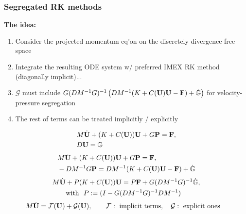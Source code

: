 \begin{frame}
\frametitle{Segregated RK methods}
\textbf{The idea:}
\begin{enumerate}
\item Consider the projected momentum eq'on on the discretely divergence free space
\item<4-> Integrate the resulting ODE system w/ preferred IMEX RK method (diagonally implicit)...
\item<5-> $\mathcal{G}$ must include $G(DM^{-1}G)^{-1} \left( DM^{-1}(K+C({\bf U}){\bf U} - {\bf F})+ \dot{\mathbb{G}} \right)$ for velocity-pressure segregation
\item<6-> The rest of terms can be treated implicitly / explicitly
\end{enumerate}
\begin{overprint}
\begin{align*}
&M\dot{{\bf U}}+(K+C({\bf U})){\bf U}+ G{\bf P}={\bf F},\\
&D{\bf U}= \mathbb{G}
\end{align*}
\begin{align*}
&M\dot{{\bf U}}+(K+C({\bf U})){\bf U}+ G{\bf P}={\bf F},\\
&-DM^{-1}G{\bf P}=DM^{-1}(K+C({\bf U}){\bf U}- {\bf F}) + \dot{\mathbb{G}}
\end{align*}
\begin{align*}
\label{eq:NS_galerkin_ou}
&M\dot{{\bf U}}+ P(K+C({\bf U})){\bf U}  = P{\bf F} + G(DM^{-1}G)^{-1} \dot{\mathbb{G}}, \\ & \qquad \hbox{with } \ P := 
(I - G(DM^{-1}G)^{-1}DM^{-1}) \end{align*}
\begin{align*}
&
M\dot{\U}=\mathcal{F}(\U)+\mathcal{G}(\U), \qquad \mathcal{F}: \hbox{ implicit terms},  \quad \mathcal{G}: \hbox{ explicit ones} %
\end{align*}
\end{overprint}
\end{frame}
